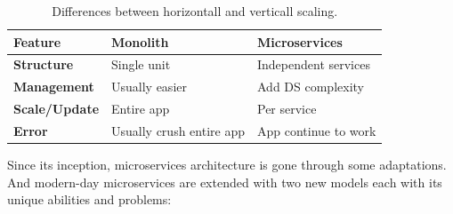 \begin{table}[h!]
	\begin{center}
		\begin{tabular}{l|l|l}
			\textbf{Feature} & \textbf{Monolith} & \textbf{Microservices}\\
			\hline
			\textbf{Structure} & Single unit & Independent services \\
			\textbf{Management} & Usually easier & Add DS complexity\\
			\textbf{Scale/Update} & Entire app & Per service \\
			\textbf{Error} & Usually crush entire app & App continue to work \\
		\end{tabular}
	\end{center}
	\vspace{-0.5cm}
	\caption{Differences between horizontall and verticall scaling.}
	\label{tab:table3}
\end{table}

Since its inception, microservices architecture is gone through some adaptations. And modern-day microservices are extended with two new models each with its unique abilities and problems:

